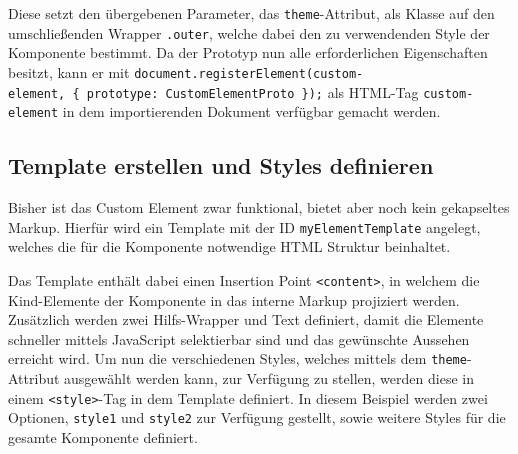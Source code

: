 Diese setzt den übergebenen Parameter, das \texttt{theme}-Attribut, als Klasse auf den umschließenden Wrapper \texttt{.outer}, welche dabei den zu verwendenden Style der Komponente bestimmt. Da der Prototyp nun alle erforderlichen Eigenschaften besitzt, kann er mit \texttt{document.registerElement(\dq custom-element\dq,\ \{\ prototype:\ CustomElementProto\ \});} als HTML-Tag \texttt{custom-element} in dem importierenden Dokument verfügbar gemacht werden.


\subsection{Template erstellen und Styles definieren}\label{template-erstellen-und-styles-definieren}

Bisher ist das Custom Element zwar funktional, bietet aber noch kein gekapseltes Markup. Hierfür wird ein Template mit der ID \texttt{myElementTemplate} angelegt, welches die für die Komponente notwendige HTML Struktur beinhaltet.

\begin{Shaded}
\begin{Highlighting}[]
\KeywordTok{>}
  \KeywordTok{>}
    \KeywordTok{>}
\end{Highlighting}
\end{Shaded}

Das Template enthält dabei einen Insertion Point \texttt{\textless{}content\textgreater{}}, in welchem die Kind-Elemente der Komponente in das interne Markup projiziert werden. Zusätzlich werden zwei Hilfs-Wrapper und Text definiert, damit die Elemente schneller mittels JavaScript selektierbar sind und das gewünschte Aussehen erreicht wird. Um nun die verschiedenen Styles, welches mittels dem \texttt{theme}-Attribut ausgewählt werden kann, zur Verfügung zu stellen, werden diese in einem \texttt{\textless{}style\textgreater{}}-Tag in dem Template definiert. In diesem Beispiel werden zwei Optionen, \texttt{style1} und \texttt{style2} zur Verfügung gestellt, sowie weitere Styles für die gesamte Komponente definiert.

\begin{Shaded}
\begin{Highlighting}[]
   \KeywordTok{\{}  \KeywordTok{\}}
   \KeywordTok{\{}  \KeywordTok{;} \KeywordTok{\}}
   \KeywordTok{\{}  \KeywordTok{;} \KeywordTok{\}}
   \KeywordTok{\{}  \DataTypeTok{35pt}\KeywordTok{;}  \DataTypeTok{0.5em}\KeywordTok{;} \KeywordTok{\}}
\end{Highlighting}
\end{Shaded}

